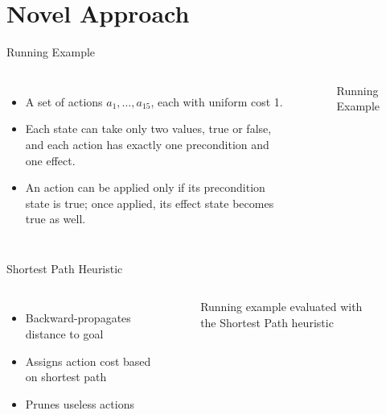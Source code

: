 \documentclass[aspectratio=169,xcolor=dvipsnames]{beamer}
\begin{document}
\section{Novel Approach}

\begin{frame}{Running Example}
	\begin{columns}[c] %
		\begin{itemize}
			\item A set of actions $a_1, \dots, a_{15}$, each with uniform cost 1.
			\item Each state can take only two values, true or false, and each action has exactly one precondition and one effect.
			\item An action can be applied only if its precondition state is true; once applied, its effect state becomes true as well.
		\end{itemize}

		\begin{figure}[ht]
			\centering
			\def\svgwidth{\linewidth}
			
			\caption{Running Example}
			\label{fig:running_example}
		\end{figure}
	\end{columns}
\end{frame}


\begin{frame}{Shortest Path Heuristic}
	\begin{columns}[c]
		\begin{itemize}
			\item Backward-propagates distance to goal
			\item Assigns action cost based on shortest path
			\item Prunes useless actions
		\end{itemize}
		\begin{figure}[ht]
			\centering
			\def\svgwidth{\linewidth}
			
			\caption{Running example evaluated with the Shortest Path heuristic}
			\label{fig:sp_scheme}
		\end{figure}
	\end{columns}
\end{frame}
\end{document}
